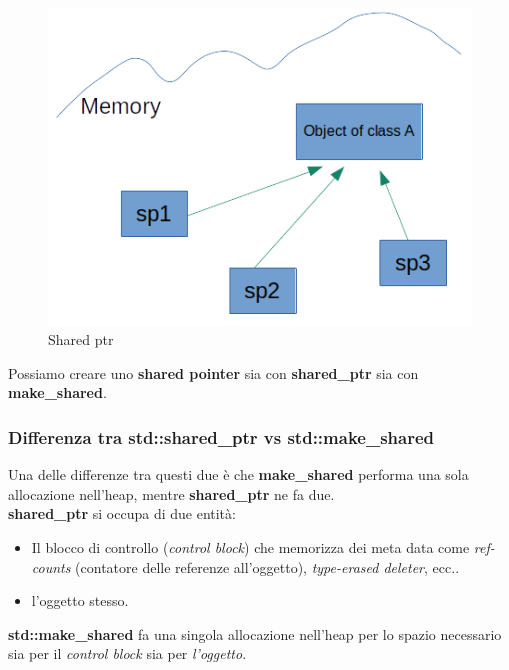 \begin{figure}[H]
	\centering
	\includegraphics[width=1\textwidth, height=1\textheight, keepaspectratio]{./imgs/shared_ptr3.png}
	\caption{Shared ptr}
	\label{fig:shared_ptr3}
\end{figure}

\textsf{\small Possiamo creare uno \textbf{shared pointer} sia con \textbf{shared\_ptr} sia con \textbf{make\_shared}.} \\

\subsubsection{Differenza tra std::shared\_ptr vs std::make\_shared}

\textsf{\small Una delle differenze tra questi due è che \textbf{make\_shared} performa una sola allocazione nell'heap, mentre \textbf{shared\_ptr} ne fa due.} \\

\textsf{\small \textbf{shared\_ptr} si occupa di due entità: } \\

\begin{itemize}
	\item \textsf{\small Il blocco di controllo (\emph{control block}) che memorizza dei meta data come \emph{ref-counts} (contatore delle referenze all'oggetto), \emph{type-erased deleter}, ecc..}
	\item \textsf{\small l'oggetto stesso.}
\end{itemize}

\textsf{\small \textbf{std::make\_shared} fa una singola allocazione nell'heap per lo spazio necessario sia per il \emph{control block} sia per \emph{l'oggetto}. } \break

